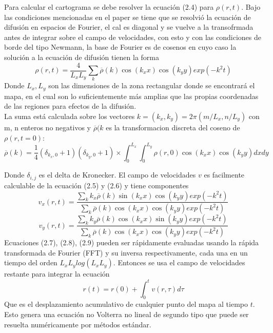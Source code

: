 \documentclass[20pt]{report}
\begin{document}
\begin{itemize}
Para calcular el cartograma  se debe resolver la ecuaci\'on (2.4) para $\rho(r,t)$. Bajo las condiciones  mencionadas en el paper se tiene que se resolvi\'o la ecuaci\'on de difusi\'on en  espacios de Fourier,  el cal es diagonal y se vuelve a la transofrmada antes de integrar sobre el campo de velocidades, con esto y  con las condiciones de borde del tipo  Newmann, la base de Fourier es de cosenos  en cuyo caso la soluci\'on a la ecuaci\'on de difusi\'on tienen la forma
\begin{equation}
\rho (r,t)= \dfrac{4}{L_x L_y} \sum_k {\overline{\rho}} (k) \cos(k_x x) \cos(k_y y)exp(-k^2 t)
\end{equation}
Donde $L_x,L_y$ son las dimensiones de la zona rectangular  donde se encontrar\'a el mapa, en el cual son  lo suficientemente m\'as amplias que las propias coordenadas de las regiones para efectos de la difusi\'on. \\
La suma est\'a calculada sobre los vectores $k=(k_x,k_y)=2 \pi (m/L_x, n/L_y)$ con m, n enteros no negativos y $\overline{\rho}(k$ es la transformacion discreta del coseno de $\rho (r, t=0)$:
\begin{equation}
\overline{\rho}(k)=\dfrac{1}{4}(\delta_{k_x,0}+1)(\delta_{k_y,0}+1)\times \int_0^{L_x} \int_0^{L_y} \rho (r,0)\cos(k_x x)\cos(k_y y) dx dy
\end{equation}


\pagebreak
Donde $\delta_{i,j}$ es el delta de Kronecker. El campo de velocidades $v$ es facilmente calculable de la ecuaci\'on (2.5) y (2.6)  y tiene componentes
\begin{equation}
v_x(r,t)=\dfrac{\sum_k {k_x\overline{\rho}} (k) \sin(k_x x) \cos(k_y y)exp(-k^2 t)}{\sum_k {\overline{\rho}} (k) \cos(k_x x) \cos(k_y y)exp(-k^2 t)}
\end{equation}
\begin{equation}
v_y(r,t)=\dfrac{\sum_k {k_y\overline{\rho}} (k) \cos(k_x x) \sin(k_y y)exp(-k^2 t)}{\sum_k {\overline{\rho}} (k) \cos(k_x x) \cos(k_y y)exp(-k^2 t)}
\end{equation}
Ecuaciones (2.7), (2.8), (2.9) pueden ser r\'apidamente evaluadas usando la r\'apida transformada de Fourier (FFT) y su inversa respectivamente,  cada una  en un tiempo del orden $L_x L_y log(L_x L_y)$. Entonces se usa  el campo de velocidades restante para integrar la ecuaci\'on 
\[r(t)= r(0) +\int_0^t v(r,\tau)d\tau\]
Que es el desplazamiento acumulativo de cualquier punto del mapa al tiempo $t$.
\\
Esto genera una ecuaci\'on  no Volterra no lineal de segundo tipo que puede ser resuelta num\'ericamente por m\'etodos est\'andar.




\end{itemize}
\end{document}
